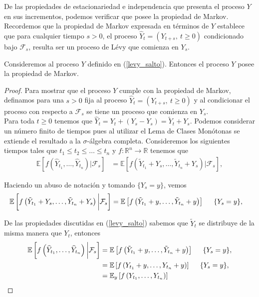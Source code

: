 De las propiedades de estacionariedad e independencia que presenta el proceso $Y$ en sus incrementos, podemos verificar que posee la propiedad de Markov. \\

Recordemos que la propiedad de Markov expresada en términos de $Y$ establece que para cualquier tiempo $s > 0$, el proceso $\widehat{Y}_t = (Y_{t+s}, \ t \geq 0)$ condicionado bajo $\mathcal{F}_s$, resulta ser un proceso de Lévy que comienza en $Y_s$.

\begin{proposition}
Consideremos al proceso $Y$ definido en (\ref{levy_salto}). Entonces el proceso $Y$ posee la propiedad de Markov.
\end{proposition}
\begin{proof}
Para mostrar que el proceso $Y$ cumple con la propiedad de Markov, definamos para una $s > 0$ fija al proceso $\widehat{Y}_t = (Y_{t+s}, \ t \geq 0)$ y al condicionar el proceso con respecto a $\mathcal{F}_s$ se tiene un proceso que comienza en $Y_s$. \\

Para toda $t \geq 0$ tenemos que $\widehat{Y}_t = Y_t + (Y_s - Y_s) = \tilde{Y}_t + Y_s$. Podemos considerar un número finito de tiempos pues al utilizar el Lema de Clases Monótonas se extiende el resultado a la $\sigma$-álgebra completa. Consideremos los siguientes tiempos tales que $t_1 \leq t_2 \leq \ldots \leq t_n$ y $f : \mathbb{R}^n \rightarrow \mathbb{R}$ tenemos que
\begin{align*}
\mathbb{E} \left[ f \left( \widehat{Y}_{t_1}, \ldots, \widehat{Y}_{t_n} \right) \bigg| \mathcal{F}_s \right] & = \mathbb{E} \left[ f \left( \tilde{Y}_{t_1} + Y_s, \ldots, \tilde{Y}_{t_n} + Y_s \right) \bigg| \mathcal{F}_s \right],
\end{align*}

Haciendo un abuso de notación y tomando $\{ Y_s = y \}$, vemos
\begin{align*}
\mathbb{E} \left[ f \left( \tilde{Y}_{t_1} + Y_s, \ldots, \tilde{Y}_{t_n} + Y_s \right) \bigg| \mathcal{F}_s \right] & = \mathbb{E} \left[ f \left( \tilde{Y}_{t_1} + y, \ldots, \tilde{Y}_{t_n} + y \right) \right] \hspace{0.5cm} \{ Y_s = y \},
\end{align*}

De las propiedades discutidas en (\ref{levy_salto}) sabemos que $\tilde{Y}_{t}$ se distribuye de la misma manera que $Y_t$, entonces
\begin{align*}
\mathbb{E} \left[ f \left( \widehat{Y}_{t_1}, \ldots, \widehat{Y}_{t_n} \right) \bigg| \mathcal{F}_s \right] & = \mathbb{E} \left[ f \left( \tilde{Y}_{t_1} + y, \ldots, \tilde{Y}_{t_n} + y \right) \right] \hspace{0.5cm} \{ Y_s = y \}, \\
& = \mathbb{E} \left[ f \left( Y_{t_1} + y, \ldots, Y_{t_n} + y \right) \right] \hspace{0.5cm} \{ Y_s = y \}, \\
& = \mathbb{E}_y \left[ f \left( Y_{t_1}, \ldots, Y_{t_n} \right) \right]
\end{align*}


\end{proof}
